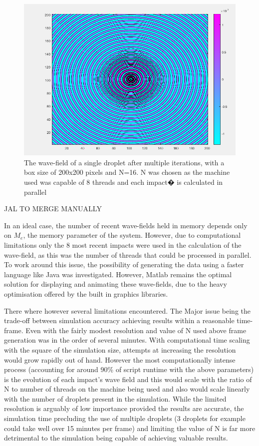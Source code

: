 \begin{figure}
\centering
\includegraphics[width=\textwidth]{simulation/matlab.png}
\caption{The wave-field of a single droplet after multiple iterations, with a box size of 200x200 pixels and N=16. N was chosen as the machine used was capable of 8 threads and each impact� is calculated in parallel}
\label{fig:matlabMaths}
\end{figure}

JAL TO MERGE MANUALLY

In an ideal case, the number of recent wave-fields held in memory depends only on $M_e$, the memory parameter of the system. However, due to computational limitations only the 8 most recent impacts were used in the calculation of the wave-field, as this was the number of threads that could be processed in parallel. To work around this issue, the possibility of generating the data using a faster language like Java was investigated. However, Matlab remains the optimal solution for displaying and animating these wave-fields, due to the heavy optimisation offered by the built in graphics libraries.

There where however several limitations encountered. The Major issue being the trade-off between simulation accuracy achieving results within a reasonable time-frame.
Even with the fairly modest resolution and value of N used above frame generation was in the order of several minutes. With computational time scaling with the square of the simulation size, attempts at increasing the resolution would grow rapidly out of hand. However the most computationally intense process (accounting for around 90\% of script runtime with the above parameters) is the evolution of each impact’s wave field and this would scale with the ratio of N to number of threads on the machine being used and also would scale linearly with the number of droplets present in the simulation. While the limited resolution is arguably of low importance provided the results are accurate, the simulation time precluding the use of multiple droplets (3 droplets for example could take well over 15 minutes per frame) and limiting the value of N is far more detrimental to the simulation being capable of achieving valuable results.

